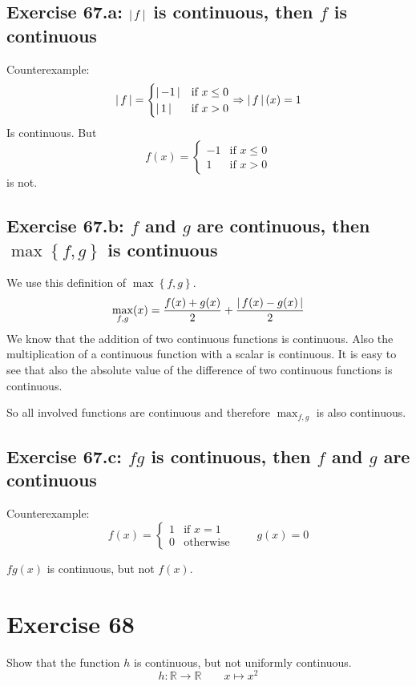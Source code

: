 \documentclass[a4paper]{article}
\theoremstyle{definition}
\newcommand\abs[1]{\left|\thinspace #1\thinspace\right|}
\newcommand\set[1]{\left\{#1\right\}}
\begin{document}
\subsection{Exercise 67.a: $\abs{f}$ is continuous, then $f$ is continuous}
%
Counterexample:
\[
  \abs{f} = \begin{cases}
    \abs{-1} & \text{if } x \leq 0 \\
    \abs{1} & \text{if } x > 0
  \end{cases}
  \Rightarrow \abs{f}(x) = 1
\]
Is continuous. But
\[
  f(x) = \begin{cases}
    -1 & \text{if } x \leq 0 \\
    1 & \text{if } x > 0
  \end{cases}
\]
is not.

\subsection{Exercise 67.b: $f$ and $g$ are continuous, then $\max\set{f, g}$ is continuous}
%
We use this definition of $\max\set{f, g}$.
\[
  \max_{f,g}(x) =
    \frac{f(x) + g(x)}{2} + \frac{\abs{f(x) - g(x)}}{2}
\]
We know that the addition of two continuous functions is continuous.
Also the multiplication of a continuous function with a scalar is continuous.
It is easy to see that also the absolute value of the difference of two continuous
functions is continuous.

So all involved functions are continuous and therefore $\max_{f,g}$ is also continuous.

\subsection{Exercise 67.c: $fg$ is continuous, then $f$ and $g$ are continuous}
%
Counterexample:
\[
  f(x) = \begin{cases}
    1 & \text{if } x = 1 \\
    0 & \text{otherwise}
  \end{cases}
  \qquad
  g(x) = 0
\]

$fg(x)$ is continuous, but not $f(x)$.

\section{Exercise 68}
\begin{ex}
  Show that the function $h$ is continuous, but not uniformly continuous.
  \[ h: \mathbb R \to \mathbb R \qquad x \mapsto x^2 \]
\end{ex}
\end{document}
